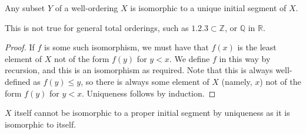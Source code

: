 \begin{proposition}
    Any subset \( Y \) of a well-ordering \( X \) is isomorphic to a unique initial segment of \( X \).
\end{proposition}
This is not true for general total orderings, such as \( \qty{1, 2, 3} \subset \mathbb Z \), or \( \mathbb Q \) in \( \mathbb R \).
\begin{proof}
    If \( f \) is some such isomorphism, we must have that \( f(x) \) is the least element of \( X \) not of the form \( f(y) \) for \( y < x \).
    We define \( f \) in this way by recursion, and this is an isomorphism as required.
    Note that this is always well-defined as \( f(y) \leq y \), so there is always some element of \( X \) (namely, \( x \)) not of the form \( f(y) \) for \( y < x \).
    Uniqueness follows by induction.
\end{proof}
\begin{remark}
    \( X \) itself cannot be isomorphic to a proper initial segment by uniqueness as it is isomorphic to itself.
\end{remark}


